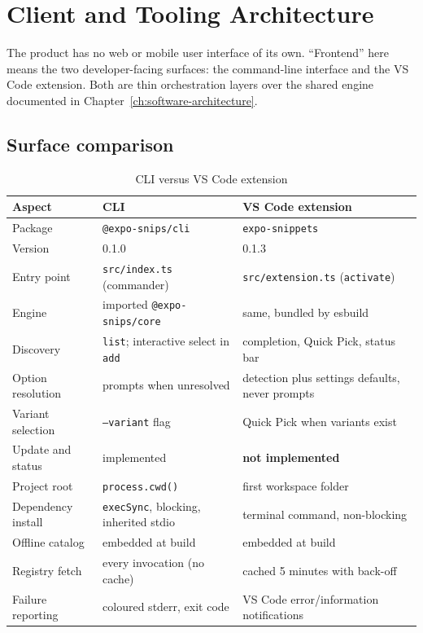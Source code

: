\chapter{Client and Tooling Architecture}
\label{ch:frontend-architecture}

The product has no web or mobile user interface of its own. ``Frontend'' here
means the two developer-facing surfaces: the command-line interface and the VS Code
extension. Both are thin orchestration layers over the shared engine documented in
Chapter~\ref{ch:software-architecture}.

\section{Surface comparison}

\begin{longtable}{p{3.4cm}p{4.6cm}p{5.8cm}}
\caption{CLI versus VS Code extension}\\
\toprule
\textbf{Aspect} & \textbf{CLI} & \textbf{VS Code extension} \\
\midrule

Package & \texttt{@expo-snips/cli} & \texttt{expo-snippets} \\
Version & 0.1.0 & 0.1.3 \\
Entry point & \texttt{src/index.ts} (commander) & \texttt{src/extension.ts} (\texttt{activate}) \\
Engine & imported \texttt{@expo-snips/core} & same, bundled by esbuild \\
Discovery & \texttt{list}; interactive select in \texttt{add} & completion, Quick Pick, status bar \\
Option resolution & prompts when unresolved & detection plus settings defaults, never prompts \\
Variant selection & \texttt{--variant} flag & Quick Pick when variants exist \\
Update and status & implemented & \textbf{not implemented} \\
Project root & \texttt{process.cwd()} & first workspace folder \\
Dependency install & \texttt{execSync}, blocking, inherited stdio & terminal command, non-blocking \\
Offline catalog & embedded at build & embedded at build \\
Registry fetch & every invocation (no cache) & cached 5 minutes with back-off \\
Failure reporting & coloured stderr, exit code & VS Code error/information notifications \\
\bottomrule
\end{longtable}

